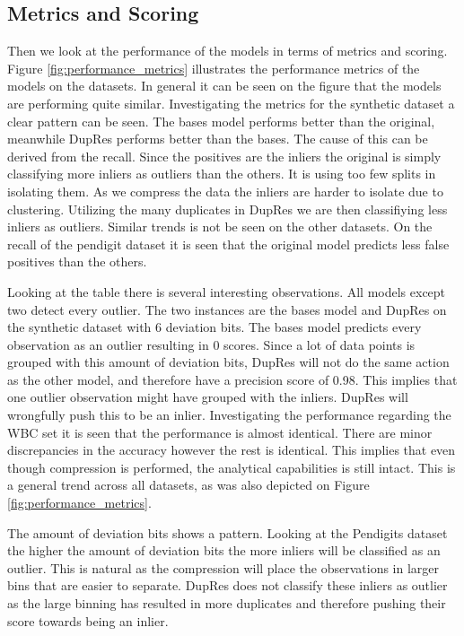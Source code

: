 \subsection{Metrics and Scoring}
Then we look at the performance of the models in terms of metrics and scoring. Figure \ref{fig:performance_metrics} illustrates the performance metrics of the models on the datasets. In general it can be seen on the figure that the models are performing quite similar. Investigating the metrics for the synthetic dataset a clear pattern can be seen. The bases model performs better than the original, meanwhile DupRes performs better than the bases. The cause of this can be derived from the recall. Since the positives are the inliers the original is simply classifying more inliers as outliers than the others. It is using too few splits in isolating them. As we compress the data the inliers are harder to isolate due to clustering. Utilizing the many duplicates in DupRes we are then classifiying less inliers as outliers. Similar trends is not be seen on the other datasets. On the recall of the pendigit dataset it is seen that the original model predicts less false positives than the others.

Looking at the table there is several interesting observations. All models except two detect every outlier. The two instances are the bases model and DupRes on the synthetic dataset with 6 deviation bits. The bases model predicts every observation as an outlier resulting in 0 scores. Since a lot of data points is grouped with this amount of deviation bits, DupRes will not do the same action as the other model, and therefore have a precision score of 0.98. This implies that one outlier observation might have grouped with the inliers. DupRes will wrongfully push this to be an inlier. Investigating the performance regarding the WBC set it is seen that the performance is almost identical. There are minor discrepancies in the accuracy however the rest is identical. This implies that even though compression is performed, the analytical capabilities is still intact. This is a general trend across all datasets, as was also depicted on Figure \ref{fig:performance_metrics}.

The amount of deviation bits shows a pattern. Looking at the Pendigits dataset the higher the amount of deviation bits the more inliers will be classified as an outlier. This is natural as the compression will place the observations in larger bins that are easier to separate. DupRes does not classify these inliers as outlier as the large binning has resulted in more duplicates and therefore pushing their score towards being an inlier.

